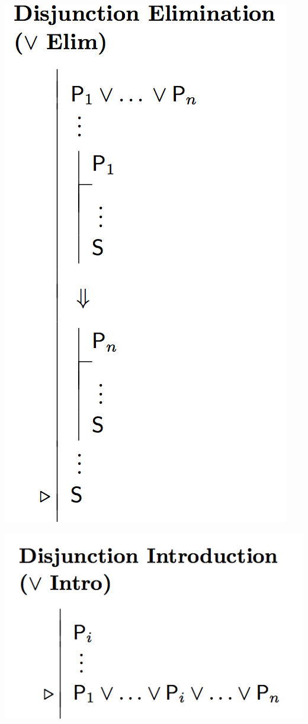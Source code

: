 \documentclass[12pt]{extarticle}
\begin{document}
\begin{multicols*}{3}
\begin{center}
\includegraphics[scale=0.3]{img/rule_disjunction_elim.png}
\end{center}
\begin{center}
\includegraphics[scale=0.3]{img/rule_disjunction_intro.png}
\end{center}
 

\end{multicols*}
\end{document}
